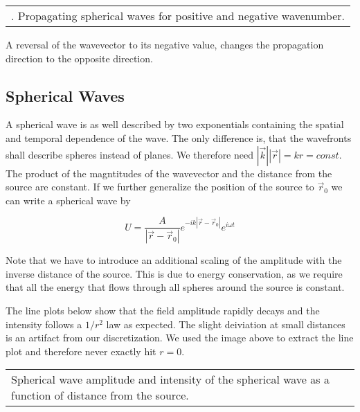 \documentclass[letterpaper,10pt,english]{sphinxmanual}
\begin{document}
\begin{savenotes}\sphinxattablestart
\centering
\begin{tabulary}{\linewidth}[t]{|T|}
\hline
\sphinxstyletheadfamily 
{}
\\
\hline
{} . Propagating spherical waves for positive and negative wavenumber.
\\
\hline
\end{tabulary}
\par
\sphinxattableend\end{savenotes}

A reversal of the wavevector to its negative value, changes the propagation direction to the opposite direction.


\subsection{Spherical Waves}
\label{\detokenize{notebooks/L8/Wave Optics:Spherical-Waves}}
A spherical wave is as well described by two exponentials containing the spatial and temporal dependence of the wave. The only difference is, that the wavefronts shall describe spheres instead of planes. We therefore need \(|\vec{k}||\vec{r}|=k r=const\). The product of the magntitudes of the wavevector and the distance from the source are constant. If we further generalize the position of the source to \(\vec{r}_{0}\) we can write a spherical wave by

\begin{equation}
U=\frac{A}{|\vec{r}-\vec{r}_{0}|}e^{-i k|\vec{r}-\vec{r}_{0}|} e^{i\omega t}
\end{equation}

Note that we have to introduce an additional scaling of the amplitude with the inverse distance of the source. This is due to energy conservation, as we require that all the energy that flows through all spheres around the source is constant.

The line plots below show that the field amplitude rapidly decays and the intensity follows a \(1/r^2\) law as expected. The slight deiviation at small distances is an artifact from our discretization. We used the image above to extract the line plot and therefore never exactly hit \(r=0\).


\begin{savenotes}\sphinxattablestart
\centering
\begin{tabulary}{\linewidth}[t]{|T|}
\hline
\sphinxstyletheadfamily 
{}
\\
\hline
{} Spherical wave amplitude and intensity of the spherical wave as a function of distance from the source.
\\
\hline
\end{tabulary}
\par
\sphinxattableend\end{savenotes}
\end{document}
